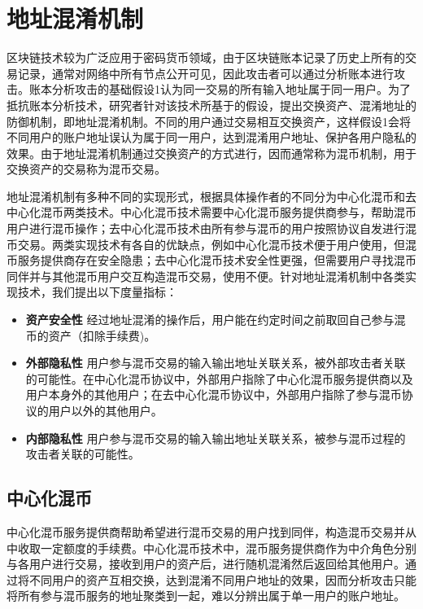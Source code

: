 \section{地址混淆机制}

区块链技术较为广泛应用于密码货币领域，由于区块链账本记录了历史上所有的交易记录，通常对网络中所有节点公开可见，因此攻击者可以通过分析账本进行攻击。账本分析攻击的基础假设1认为同一交易的所有输入地址属于同一用户。为了抵抗账本分析技术，研究者针对该技术所基于的假设，提出交换资产、混淆地址的防御机制，即地址混淆机制。不同的用户通过交易相互交换资产，这样假设1会将不同用户的账户地址误认为属于同一用户，达到混淆用户地址、保护各用户隐私的效果。由于地址混淆机制通过交换资产的方式进行，因而通常称为混币机制，用于交换资产的交易称为混币交易。

地址混淆机制有多种不同的实现形式，根据具体操作者的不同分为中心化混币和去中心化混币两类技术。中心化混币技术需要中心化混币服务提供商参与，帮助混币用户进行混币操作；去中心化混币技术由所有参与混币的用户按照协议自发进行混币交易。两类实现技术有各自的优缺点，例如中心化混币技术便于用户使用，但混币服务提供商存在安全隐患；去中心化混币技术安全性更强，但需要用户寻找混币同伴并与其他混币用户交互构造混币交易，使用不便。针对地址混淆机制中各类实现技术，我们提出以下度量指标：

\begin{itemize}
	\item \textbf{资产安全性} 经过地址混淆的操作后，用户能在约定时间之前取回自己参与混币的资产（扣除手续费)。
	\item \textbf{外部隐私性} 用户参与混币交易的输入输出地址关联关系，被外部攻击者关联的可能性。在中心化混币协议中，外部用户指除了中心化混币服务提供商以及用户本身外的其他用户；在去中心化混币协议中，外部用户指除了参与混币协议的用户以外的其他用户。
	\item \textbf{内部隐私性} 用户参与混币交易的输入输出地址关联关系，被参与混币过程的攻击者关联的可能性。
\end{itemize}

\subsection{中心化混币}

中心化混币服务提供商帮助希望进行混币交易的用户找到同伴，构造混币交易并从中收取一定额度的手续费。中心化混币技术中，混币服务提供商作为中介角色分别与各用户进行交易，接收到用户的资产后，进行随机混淆然后返回给其他用户。通过将不同用户的资产互相交换，达到混淆不同用户地址的效果，因而分析攻击只能将所有参与混币服务的地址聚类到一起，难以分辨出属于单一用户的账户地址。


